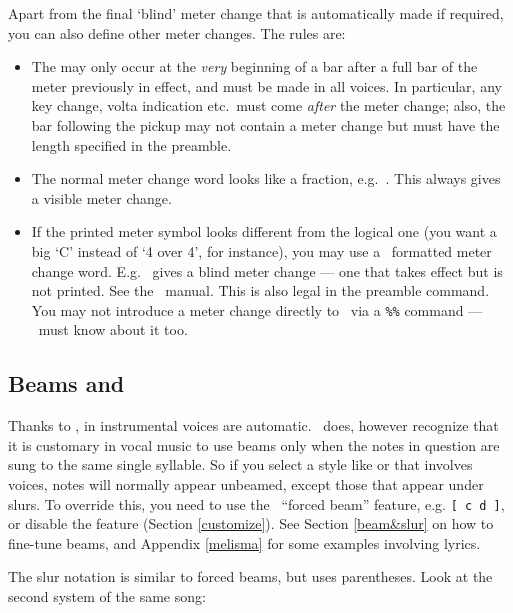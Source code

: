 \documentclass[11pt]{article}
\begin{document}
Apart from the final `blind' meter change that is automatically made if 
required, you can also define other meter changes.  
The rules are:
  \begin{itemize}  
  \item  The  may only occur at the \emph{very} beginning 
of a bar after 
a full bar of the meter previously in effect, and must be made in all 
voices.  In particular, any key change, volta indication etc.\ must come
\emph{after} the meter change; also, the bar following the pickup may
not contain a meter change but must have the length specified in the
preamble.
  \item  The normal meter change word looks like a fraction, 
e.g.~.  This always gives a visible meter change.
  \item  If the printed meter symbol looks different from the logical one (you 
want a big `C' instead of `4 over 4', for instance), you may use a \PMX\ 
formatted meter change word.   
E.g.~ gives a blind meter change 
--- one that takes effect but is not printed.  See the \PMX\ manual.
This is also legal in the preamble \ttxem{Meter:} command. 
You may not introduce a meter change directly to \PMX\ via a \verb"%%"
command --- \MTx\ must know about it too.    
  \end{itemize}

\subsection{Beams and }  \label{beamslur}

Thanks to \PMX,  in instrumental voices are automatic. \MTx~does, 
however recognize that it is customary in vocal music to use beams only 
when the notes in question are sung to the same single syllable.  So if you 
select a style like \ttxem{SATB} or \ttxem{Singer} that involves 
voices, notes will normally appear unbeamed, except those that appear 
under slurs. To override this, you need to use the \PMX\ ``forced beam'' 
feature, e.g. \verb"[ c d ]", or disable the 
 feature (Section \ref{customize}).  
See Section \ref{beam&slur} on how to 
fine-tune beams, and Appendix \ref{melisma} for some examples involving
lyrics.  

The slur notation is similar to forced beams, but uses parentheses.
Look at the second system of the same song: 
\end{document}
